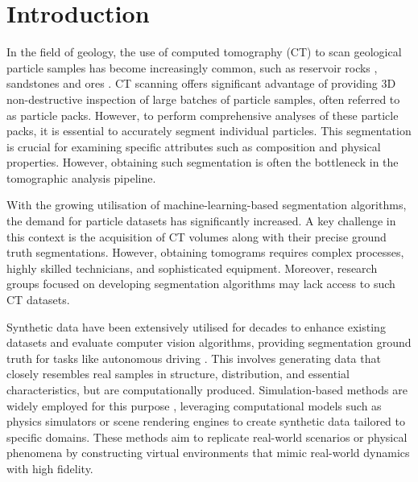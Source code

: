 \documentclass[preprint,12pt]{elsarticle}
\begin{document}

\section{Introduction} \label{sec:introduction}
In the field of geology, the use of computed tomography (CT) to scan geological particle samples has become increasingly common, such as reservoir rocks \cite{VANGEET200025}, sandstones \cite{cnudde20123d} and ores \cite{warlo2021multi}.
CT scanning offers significant advantage of providing 3D non-destructive inspection of large batches of particle samples, often referred to as particle packs.
However, to perform comprehensive analyses of these particle packs, it is essential to accurately segment individual particles. 
This segmentation is crucial for examining specific attributes such as composition and physical properties.
However, obtaining such segmentation is often the bottleneck in the tomographic analysis pipeline.
\par
With the growing utilisation of machine-learning-based segmentation algorithms, the demand for particle datasets has significantly increased. 
A key challenge in this context is the acquisition of CT volumes along with their precise ground truth segmentations. 
However, obtaining tomograms requires complex processes, highly skilled technicians, and sophisticated equipment. %
Moreover, research groups focused on developing segmentation algorithms may lack access to such CT datasets. 
\par
Synthetic data have been extensively utilised for decades to enhance existing datasets and evaluate computer vision algorithms, providing segmentation ground truth for tasks like autonomous driving \citep{richter2016playingdatagroundtruth}. 
This involves generating data that closely resembles real samples in structure, distribution, and essential characteristics, but are computationally produced.
Simulation-based methods are widely employed for this purpose \citep{demelo2022nextgeneration}, leveraging computational models such as physics simulators or scene rendering engines to create synthetic data tailored to specific domains. 
These methods aim to replicate real-world scenarios or physical phenomena by constructing virtual environments that mimic real-world dynamics with high fidelity.
\end{document}
